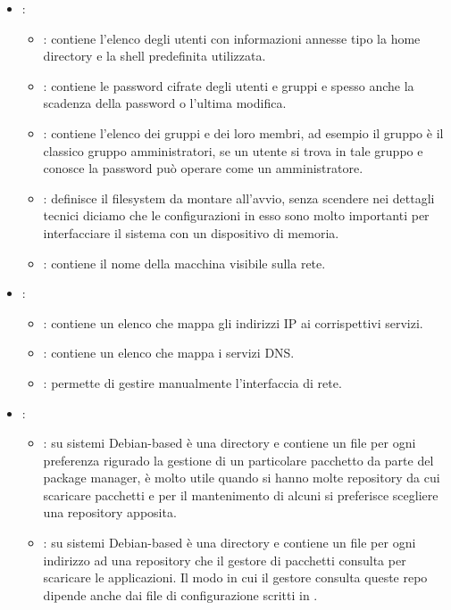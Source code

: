 \begin{itemize}
    \item {}:
    \begin{itemize}
        \item {}: contiene l'elenco degli utenti con informazioni annesse tipo la home directory e la shell predefinita utilizzata.
        \item {}: contiene le password cifrate degli utenti e gruppi e spesso anche la scadenza della password o l'ultima modifica.
        \item {}: contiene l'elenco dei gruppi e dei loro membri, ad esempio il gruppo  è il classico gruppo amministratori, se un utente si trova in tale gruppo e conosce la password può operare come un amministratore.
        \item {}: definisce il filesystem da montare all'avvio, senza scendere nei dettagli tecnici diciamo che le configurazioni in esso sono molto importanti per interfacciare il sistema con un dispositivo di memoria.
        \item {}: contiene il nome della macchina visibile sulla rete.
    \end{itemize}
    \item {}:
    \begin{itemize}
        \item {}: contiene un elenco che mappa gli indirizzi IP ai corrispettivi servizi.
        \item {}: contiene un elenco che mappa i servizi DNS.
        \item {}: permette di gestire manualmente l'interfaccia di rete.
    \end{itemize}
    \item {}:
    \begin{itemize}
        \item {}: su sistemi Debian-based è una directory e contiene un file per ogni preferenza rigurado la gestione di un particolare pacchetto da parte del package manager, è molto utile quando si hanno molte repository da cui scaricare pacchetti e per il mantenimento di alcuni si preferisce scegliere una repository apposita.
        \item {}: su sistemi Debian-based è una directory e contiene un file per ogni indirizzo ad una repository che il gestore di pacchetti consulta per scaricare le applicazioni. Il modo in cui il gestore consulta queste repo dipende anche dai file di configurazione scritti in .

\end{itemize}
\end{itemize}
